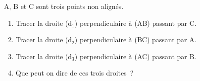 \documentclass[exercice]{thedocument}%
\begin{document}
%
A, B et C sont trois points non alignés.
\begin{center}
\end{center}
\begin{enumerate}
    \item Tracer la droite (d$_1$) perpendiculaire à (AB) passant par C.
    \item Tracer la droite (d$_2$) perpendiculaire à (BC) passant par A.
    \item Tracer la droite (d$_3$) perpendiculaire à (AC) passant par B.
    \item Que peut on dire de ces trois droites~?
\end{enumerate}
\end{document}
